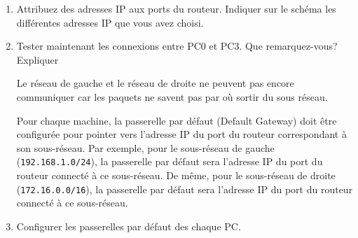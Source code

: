 \begin{exercice_cours}{}
\begin{enumerate}
\begin{minipage}{0.48\linewidth}
\begin{tcolorbox}[height = 3cm]
        \end{tcolorbox}
        \end{minipage}
        


        

        \medskip

        \begin{easybox}{}
        La configuration du routeur doit respecter les contraintes suivantes:
        \begin{itemize}
            \item le port du routeur relié au sous réseau de gauche doit posséder une adresse IP de ce sous réseau. En général on lui donne la dernière adresse disponible.
            \item même configuration pour le port du routeur relié au sous réseau de droite.
        \end{itemize}
        \end{easybox}

        \item Attribuez des adresses IP aux ports du routeur. Indiquer sur le schéma les différentes adresses IP que vous avez choisi. 
        \item Tester maintenant les connexions entre PC0 et PC3. Que remarquez-vous? Expliquer
        
        \begin{tcolorbox}[height = 1.5cm]
        
        \end{tcolorbox}

        \begin{easybox}{}
            Le réseau de gauche et le réseau de droite ne peuvent pas encore communiquer car les paquets ne savent pas par où sortir du sous réseau.

            Pour chaque machine, la passerelle par défaut (Default Gateway) doit être configurée pour pointer vers l'adresse IP du port du routeur correspondant à son sous-réseau. Par exemple, pour le sous-réseau de gauche (\verb+192.168.1.0/24+), la passerelle par défaut sera l'adresse IP du port du routeur connecté à ce sous-réseau. De même, pour le sous-réseau de droite (\verb+172.16.0.0/16+), la passerelle par défaut sera l'adresse IP du port du routeur connecté à ce sous-réseau.
        \end{easybox}

        \item Configurer les passerelles par défaut des chaque PC.
        

\end{enumerate}
\end{exercice_cours}
